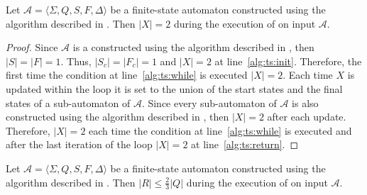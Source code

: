 \begin{proposition}\label{prop:thompson_sep_4}
  Let $\mathcal{A} = \langle \Sigma, Q, S, F, \Delta \rangle$ be a finite-state
  automaton constructed using the algorithm described in . Then
  $|X| = 2$ during the execution of  on input
  $\mathcal{A}$.
\end{proposition}

\begin{proof}
  Since $\mathcal{A}$ is a constructed using the algorithm described in
  , then $|S| = |F| = 1$. Thus, $|S_c| = |F_c| = 1$ and $|X| = 2$
  at line~\ref{alg:ts:init}. Therefore, the first time the condition at line~\ref{alg:ts:while} is executed $|X| = 2$.
  Each time $X$ is updated within the loop it is set to the union of the start states
  and the final states of a sub-automaton of $\mathcal{A}$. Since every sub-automaton
  of $\mathcal{A}$ is also constructed using the algorithm described in
  , then $|X| = 2$ after each update. Therefore, $|X| = 2$ each
  time the condition at line~\ref{alg:ts:while} is executed and after the last iteration of the loop
  $|X| = 2$ at line~\ref{alg:ts:return}.
\end{proof}

\begin{proposition}\label{prop:thompson_sep_5}
  Let $\mathcal{A} = \langle \Sigma, Q, S, F, \Delta \rangle$ be a finite-state
  automaton constructed using the algorithm described in . Then
  $|R| \leq \frac{2}{3} |Q|$ during the execution of  on
  input $\mathcal{A}$.
\end{proposition}


